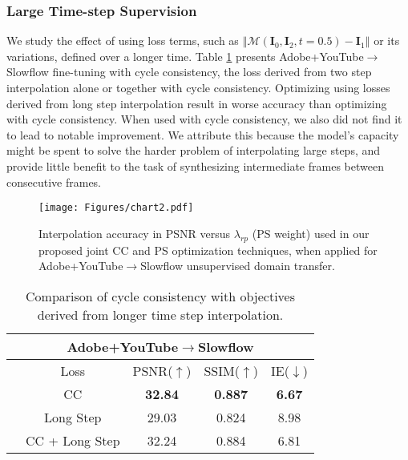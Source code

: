 \documentclass[10pt,twocolumn,letterpaper]{article}
\renewcommand{\textrightarrow}{$\rightarrow$}
\begin{document}
\subsubsection{Large Time-step Supervision}
\label{large_step_supervision}
We study the effect of using loss terms, such as $\left \Vert\mathcal{M}(\textbf{I}_{0},\textbf{I}_{2},t=0.5)-\textbf{I}_{1}\right \Vert$ or its variations, defined over a longer time. Table \ref{table:Long_step_objective} presents Adobe+YouTube\textrightarrow Slowflow fine-tuning with cycle consistency, the loss derived from two step interpolation alone or together with cycle consistency. Optimizing using losses derived from long step interpolation result in worse accuracy than optimizing with cycle consistency. When used with cycle consistency, we also did not find it to lead to notable improvement. We attribute this because the model's capacity might be spent to solve the harder problem of interpolating large steps, and provide little benefit to the task of synthesizing intermediate frames between consecutive frames.

 \begin{figure}[t]
    \centering
    \texttt{[image: Figures/chart2.pdf]}
    \caption{Interpolation accuracy in PSNR versus $\lambda_{rp}$ (PS weight) used in our proposed joint CC and PS optimization techniques, when applied for Adobe+YouTube\textrightarrow Slowflow unsupervised domain transfer. }
    \label{fig:Optimal_PSL_weight_selection}
\end{figure}

\begin{table}[h!]
\small
\centering
\begin{tabular}{c c c  c  c  }
\hline
\multicolumn{5}{c}{\textbf{Adobe+YouTube}\textrightarrow \textbf{Slowflow}} \\ 
\hline
 & Loss & PSNR($\uparrow$)  & SSIM($\uparrow$) & IE($\downarrow$) \\ 
\hline
 & CC & \textbf{32.84}  & \textbf{0.887}  & \textbf{6.67}  \\
 & Long Step & 29.03  & 0.824  & 8.98  \\ 
 & CC + Long Step & 32.24  & 0.884  & 6.81  \\ 
\hline
\end{tabular}
\caption{Comparison of cycle consistency with objectives derived from longer time step interpolation.}
\label{table:Long_step_objective}
\end{table}
\end{document}
